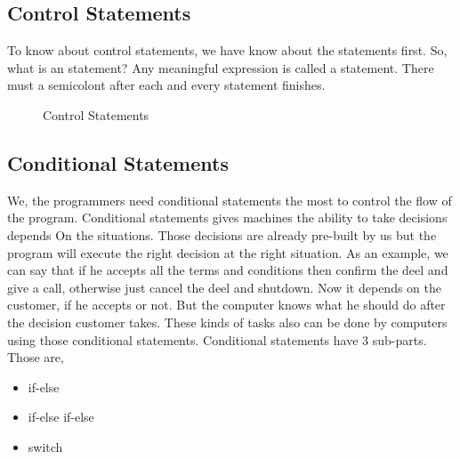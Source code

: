 \documentclass[openany]{book}  %
\begin{document}
\begin{flushleft}
    \chapter{Control Statements}
    To know about control statements, we have know about the statements first. So, what is an statement? Any meaningful expression is called a statement.
    There must a semicolont after each and every statement finishes.
    \begin{figure}[htbp]
        \begin{center}
            \caption{Control Statements\cite{Ref3}}
        \end{center}
    \end{figure}
    \section{Conditional Statements}
    We, the programmers need conditional statements the most to control the flow of the program. Conditional statements gives machines the ability to take decisions depends On
    the situations. Those decisions are already pre-built by us but the program will execute the right decision at the right situation. As an example, we can say that if he accepts
    all the terms and conditions then confirm the deel and give a call, otherwise just cancel the deel and shutdown. Now it depends on the customer, if he accepts or not.
    But the computer knows what he should do after the decision customer takes. These kinds of tasks also can be done by computers using those conditional
    statements. Conditional statements have 3 sub-parts. Those are,
    \begin{itemize}
        \item if-else
        \item if-else if-else
        \item switch
    \end{itemize}

\end{flushleft}
\end{document}
